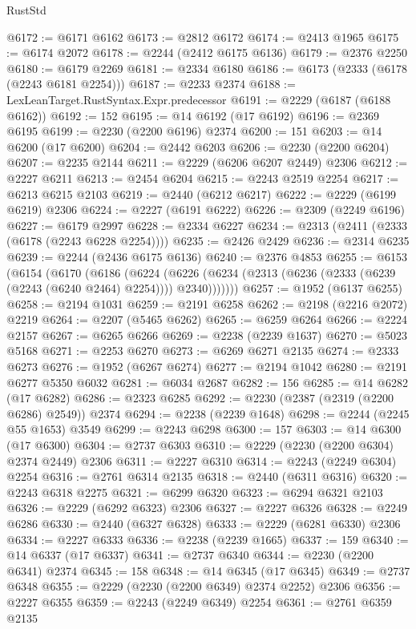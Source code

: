 \begin{lexlean}{RustStd}
\begin{coremodule}
@6172 := @6171 @6162
@6173 := @2812 @6172
@6174 := @2413 @1965
@6175 := @6174 @2072
@6178 := @2244 (@2412 @6175 @6136)
@6179 := @2376 @2250
@6180 := @6179 @2269
@6181 := @2334 @6180
@6186 := @6173 (@2333 (@6178 (@2243 @6181 @2254)))
@6187 := @2233 @2374
@6188 := LexLeanTarget.RustSyntax.Expr.predecessor
@6191 := @2229 (@6187 (@6188 @6162))
@6192 := 152
@6195 := @14 @6192 (@17 @6192)
@6196 := @2369 @6195
@6199 := @2230 (@2200 @6196) @2374
@6200 := 151
@6203 := @14 @6200 (@17 @6200)
@6204 := @2442 @6203
@6206 := @2230 (@2200 @6204)
@6207 := @2235 @2144
@6211 := @2229 (@6206 @6207 @2449) @2306
@6212 := @2227 @6211
@6213 := @2454 @6204
@6215 := @2243 @2519 @2254
@6217 := @6213 @6215 @2103
@6219 := @2440 (@6212 @6217)
@6222 := @2229 (@6199 @6219) @2306
@6224 := @2227 (@6191 @6222)
@6226 := @2309 (@2249 @6196)
@6227 := @6179 @2997
@6228 := @2334 @6227
@6234 := @2313 (@2411 (@2333 (@6178 (@2243 @6228 @2254))))
@6235 := @2426 @2429
@6236 := @2314 @6235
@6239 := @2244 (@2436 @6175 @6136)
@6240 := @2376 @4853
@6255 := @6153
    (@6154
      (@6170
        (@6186
          (@6224
            (@6226 (@6234 (@2313 (@6236 (@2333 (@6239 (@2243 (@6240 @2464) @2254)))) @2340)))))))
@6257 := @1952 (@6137 @6255)
@6258 := @2194 @1031
@6259 := @2191 @6258
@6262 := @2198 (@2216 @2072) @2219
@6264 := @2207 (@5465 @6262)
@6265 := @6259 @6264
@6266 := @2224 @2157
@6267 := @6265 @6266
@6269 := @2238 (@2239 @1637)
@6270 := @5023 @5168
@6271 := @2253 @6270
@6273 := @6269 @6271 @2135
@6274 := @2333 @6273
@6276 := @1952 (@6267 @6274)
@6277 := @2194 @1042
@6280 := @2191 @6277 @5350 @6032
@6281 := @6034 @2687
@6282 := 156
@6285 := @14 @6282 (@17 @6282)
@6286 := @2323 @6285
@6292 := @2230 (@2387 (@2319 (@2200 @6286) @2549)) @2374
@6294 := @2238 (@2239 @1648)
@6298 := @2244 (@2245 @55 @1653) @3549
@6299 := @2243 @6298
@6300 := 157
@6303 := @14 @6300 (@17 @6300)
@6304 := @2737 @6303
@6310 := @2229 (@2230 (@2200 @6304) @2374 @2449) @2306
@6311 := @2227 @6310
@6314 := @2243 (@2249 @6304) @2254
@6316 := @2761 @6314 @2135
@6318 := @2440 (@6311 @6316)
@6320 := @2243 @6318 @2275
@6321 := @6299 @6320
@6323 := @6294 @6321 @2103
@6326 := @2229 (@6292 @6323) @2306
@6327 := @2227 @6326
@6328 := @2249 @6286
@6330 := @2440 (@6327 @6328)
@6333 := @2229 (@6281 @6330) @2306
@6334 := @2227 @6333
@6336 := @2238 (@2239 @1665)
@6337 := 159
@6340 := @14 @6337 (@17 @6337)
@6341 := @2737 @6340
@6344 := @2230 (@2200 @6341) @2374
@6345 := 158
@6348 := @14 @6345 (@17 @6345)
@6349 := @2737 @6348
@6355 := @2229 (@2230 (@2200 @6349) @2374 @2252) @2306
@6356 := @2227 @6355
@6359 := @2243 (@2249 @6349) @2254
@6361 := @2761 @6359 @2135

\end{coremodule}
\end{lexlean}
